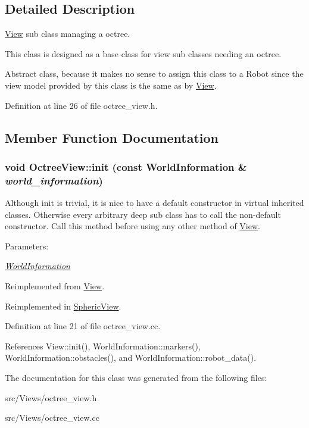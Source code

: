 \subsection{Detailed Description}
\hyperlink{class_view}{View} sub class managing a octree. 

This class is designed as a base class for view sub classes needing an octree.

Abstract class, because it makes no sense to assign this class to a Robot since the view model provided by this class is the same as by \hyperlink{class_view}{View}. 

Definition at line 26 of file octree\_\-view.h.

\subsection{Member Function Documentation}
\hypertarget{class_octree_view_800b8d09dbd898769439f1765e7d87b1}{
\subsubsection[init]{\setlength{\rightskip}{0pt plus 5cm}void OctreeView::init (const {\bf WorldInformation} \& {\em world\_\-information})}}
\label{class_octree_view_800b8d09dbd898769439f1765e7d87b1}


Although init is trivial, it is nice to have a default constructor in virtual inherited classes. Otherwise every arbitrary deep sub class has to call the non-default constructor. Call this method before using any other method of \hyperlink{class_view}{View}. \begin{Desc}
\item[Parameters:]
\begin{description}
\item[{\em \hyperlink{class_world_information}{WorldInformation}}]\end{description}
\end{Desc}


Reimplemented from \hyperlink{class_view_fa489c0530d45e3e24c3151c0908240d}{View}.

Reimplemented in \hyperlink{class_spheric_view_dbd6a1d5e2f17594f82e831c38d35ec6}{SphericView}.

Definition at line 21 of file octree\_\-view.cc.

References View::init(), WorldInformation::markers(), WorldInformation::obstacles(), and WorldInformation::robot\_\-data().

The documentation for this class was generated from the following files:\begin{CompactItemize}
\item 
src/Views/octree\_\-view.h\item 
src/Views/octree\_\-view.cc\end{CompactItemize}

